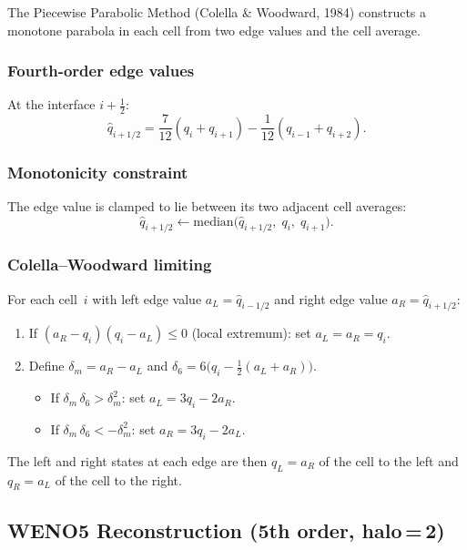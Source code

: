 \documentclass[11pt,a4paper]{article}
\newcommand{\half}{\tfrac{1}{2}}
\begin{document}
The Piecewise Parabolic Method (Colella \& Woodward, 1984) constructs a monotone parabola in each cell from two edge values and the cell average.

\subsubsection{Fourth-order edge values}
At the interface $i\!+\!\half$:
\begin{equation}
  \hat q_{i+1/2} = \frac{7}{12}(q_i+q_{i+1}) - \frac{1}{12}(q_{i-1}+q_{i+2}).
\end{equation}

\subsubsection{Monotonicity constraint}
The edge value is clamped to lie between its two adjacent cell averages:
\begin{equation}
  \hat q_{i+1/2} \leftarrow \mathrm{median}\!\bigl(\hat q_{i+1/2},\;q_i,\;q_{i+1}\bigr).
\end{equation}

\subsubsection{Colella--Woodward limiting}
For each cell~$i$ with left edge value $a_L=\hat q_{i-1/2}$ and right edge value $a_R=\hat q_{i+1/2}$:
\begin{enumerate}[nosep]
  \item If $(a_R-q_i)(q_i-a_L)\le 0$ (local extremum): set $a_L=a_R=q_i$.
  \item Define $\delta_m=a_R-a_L$ and $\delta_6=6\bigl(q_i-\half(a_L+a_R)\bigr)$.
  \begin{itemize}[nosep]
    \item If $\delta_m\,\delta_6>\delta_m^2$: set $a_L=3q_i-2a_R$.
    \item If $\delta_m\,\delta_6<-\delta_m^2$: set $a_R=3q_i-2a_L$.
  \end{itemize}
\end{enumerate}
The left and right states at each edge are then $q_L=a_R$ of the cell to the left and $q_R=a_L$ of the cell to the right.

\subsection{WENO5 Reconstruction (5th order, halo\,=\,2)}
\end{document}
